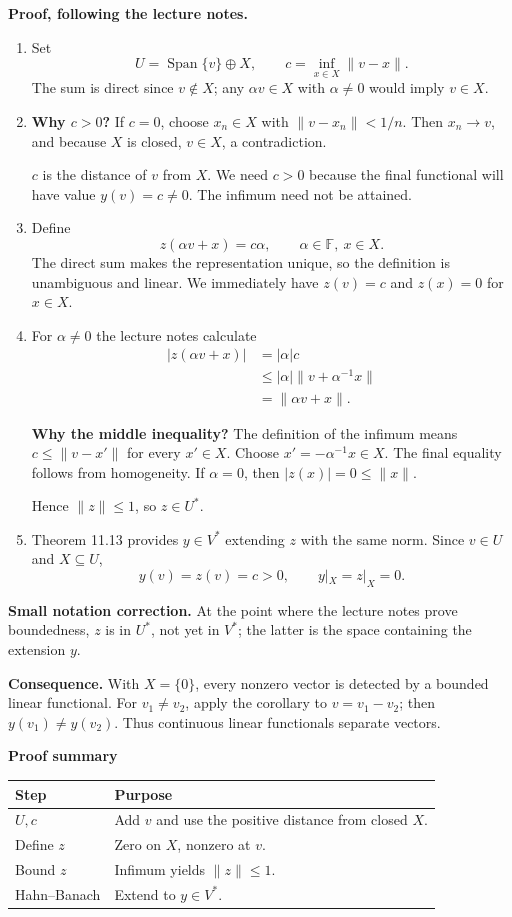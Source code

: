 \documentclass[11pt,a4paper]{article}
\newcommand{\F}{\mathbb F}
\newenvironment{proofsteps}{\begin{enumerate}\setlength{\itemsep}{4pt}}{\end{enumerate}}
\newcommand{\prooftable}[1]{\medskip\textbf{Proof summary}\par\smallskip #1\medskip}
\begin{document}
\textbf{Proof, following the lecture notes.}
\begin{proofsteps}
\item Set
\[
 U=\operatorname{Span}\{v\}\oplus X,\qquad
 c=\inf_{x\in X}\|v-x\|.
\]
The sum is direct since \(v\notin X\); any \(\alpha v\in X\) with \(\alpha\ne0\) would imply \(v\in X\).
\item \textbf{Why \(c>0\)?} If \(c=0\), choose \(x_n\in X\) with \(\|v-x_n\|<1/n\). Then \(x_n\to v\), and because \(X\) is closed, \(v\in X\), a contradiction.
\begin{personalnote}
\(c\) is the distance of \(v\) from \(X\). We need \(c>0\) because the final functional will have value \(y(v)=c\neq0\). The infimum need not be attained.
\end{personalnote}
\item Define
\[
 \boxed{z(\alpha v+x)=c\alpha,\qquad \alpha\in\F,\ x\in X.}
\]
The direct sum makes the representation unique, so the definition is unambiguous and linear. We immediately have \(z(v)=c\) and \(z(x)=0\) for \(x\in X\).
\item For \(\alpha\neq0\) the lecture notes calculate
\[
 \begin{aligned}
 |z(\alpha v+x)|
 &=|\alpha|c\\
 &\leq|\alpha|\|v+\alpha^{-1}x\|\\
 &=\|\alpha v+x\|.
 \end{aligned}
\]
\begin{personalnote}
\textbf{Why the middle inequality?} The definition of the infimum means \(c\leq\|v-x'\|\) for every \(x'\in X\). Choose \(x'=-\alpha^{-1}x\in X\). The final equality follows from homogeneity. If \(\alpha=0\), then \(|z(x)|=0\leq\|x\|\).
\end{personalnote}
Hence \(\|z\|\leq1\), so \(z\in U^*\).
\item Theorem 11.13 provides \(y\in V^*\) extending \(z\) with the same norm. Since \(v\in U\) and \(X\subseteq U\),
\[
 \boxed{y(v)=z(v)=c>0,\qquad y|_X=z|_X=0.}
\]
\end{proofsteps}
\begin{personalnote}
\textbf{Small notation correction.} At the point where the lecture notes prove boundedness, \(z\) is in \(U^*\), not yet in \(V^*\); the latter is the space containing the extension \(y\).

\textbf{Consequence.} With \(X=\{0\}\), every nonzero vector is detected by a bounded linear functional. For \(v_1\neq v_2\), apply the corollary to \(v=v_1-v_2\); then \(y(v_1)\neq y(v_2)\). Thus continuous linear functionals separate vectors.
\end{personalnote}
\prooftable{\begin{tabularx}{\linewidth}{@{}p{.24\linewidth}X@{}}\hline
Step & Purpose\\\hline
\(U,c\) & Add \(v\) and use the positive distance from closed \(X\).\\
Define \(z\) & Zero on \(X\), nonzero at \(v\).\\
Bound \(z\) & Infimum yields \(\|z\|\leq1\).\\
Hahn--Banach & Extend to \(y\in V^*\).\\\hline
\end{tabularx}}
\end{document}
